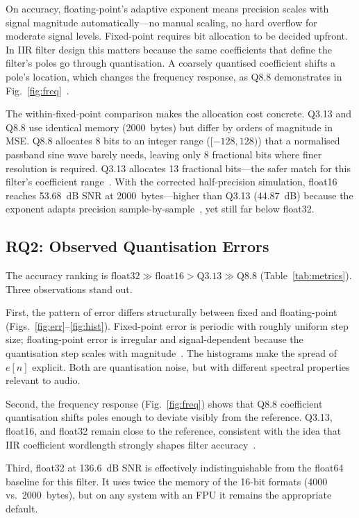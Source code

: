 \documentclass[conference]{IEEEtran}
\begin{document}
On accuracy, floating-point's adaptive exponent means precision scales with signal magnitude automatically---no manual scaling, no hard overflow for moderate signal levels. Fixed-point requires bit allocation to be decided upfront. In IIR filter design this matters because the same coefficients that define the filter's poles go through quantisation. A coarsely quantised coefficient shifts a pole's location, which changes the frequency response, as Q8.8 demonstrates in Fig.~\ref{fig:freq}~\cite{smith1997}.

The within-fixed-point comparison makes the allocation cost concrete. Q3.13 and Q8.8 use identical memory (2000~bytes) but differ by orders of magnitude in MSE. Q8.8 allocates 8 bits to an integer range ([$-128,128)$) that a normalised passband sine wave barely needs, leaving only 8 fractional bits where finer resolution is required. Q3.13 allocates 13 fractional bits---the safer match for this filter's coefficient range~\cite{ti2007}. With the corrected half-precision simulation, float16 reaches 53.68~dB SNR at 2000~bytes---higher than Q3.13 (44.87~dB) because the exponent adapts precision sample-by-sample~\cite{ieee754}, yet still far below float32.

\subsection{RQ2: Observed Quantisation Errors}
The accuracy ranking is $\mathrm{float32} \gg \mathrm{float16} > \mathrm{Q3.13} \gg \mathrm{Q8.8}$ (Table~\ref{tab:metrics}). Three observations stand out.

First, the pattern of error differs structurally between fixed and floating-point (Figs.~\ref{fig:err}--\ref{fig:hist}). Fixed-point error is periodic with roughly uniform step size; floating-point error is irregular and signal-dependent because the quantisation step scales with magnitude~\cite{smith1997}. The histograms make the spread of $e[n]$ explicit. Both are quantisation noise, but with different spectral properties relevant to audio.

Second, the frequency response (Fig.~\ref{fig:freq}) shows that Q8.8 coefficient quantisation shifts poles enough to deviate visibly from the reference. Q3.13, float16, and float32 remain close to the reference, consistent with the idea that IIR coefficient wordlength strongly shapes filter accuracy~\cite{smith1997}.

Third, float32 at 136.6~dB SNR is effectively indistinguishable from the float64 baseline for this filter. It uses twice the memory of the 16-bit formats (4000 vs.\ 2000~bytes), but on any system with an FPU it remains the appropriate default.
\end{document}
